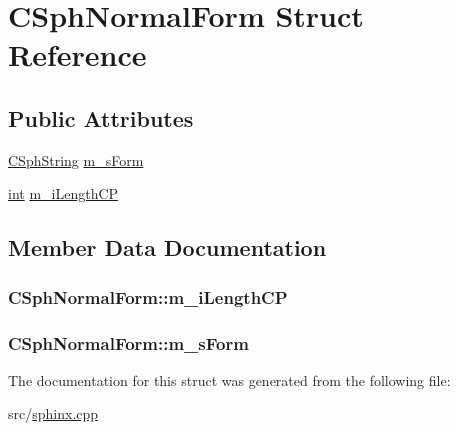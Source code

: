 \hypertarget{structCSphNormalForm}{\section{C\-Sph\-Normal\-Form Struct Reference}
\label{structCSphNormalForm}
}
\subsection*{Public Attributes}
\begin{DoxyCompactItemize}
\item 
\hyperlink{structCSphString}{C\-Sph\-String} \hyperlink{structCSphNormalForm_ab12c90fd6c4bee1e81d4bf50fff2de90}{m\-\_\-s\-Form}
\item 
\hyperlink{sphinxexpr_8cpp_a4a26e8f9cb8b736e0c4cbf4d16de985e}{int} \hyperlink{structCSphNormalForm_a0d9d2a8f0ed99cbb8d8a1b5eb41b5d57}{m\-\_\-i\-Length\-C\-P}
\end{DoxyCompactItemize}


\subsection{Member Data Documentation}
\hypertarget{structCSphNormalForm_a0d9d2a8f0ed99cbb8d8a1b5eb41b5d57}{
\subsubsection[{m\-\_\-i\-Length\-C\-P}]{ C\-Sph\-Normal\-Form\-::m\-\_\-i\-Length\-C\-P}}\label{structCSphNormalForm_a0d9d2a8f0ed99cbb8d8a1b5eb41b5d57}
\hypertarget{structCSphNormalForm_ab12c90fd6c4bee1e81d4bf50fff2de90}{
\subsubsection[{m\-\_\-s\-Form}]{ C\-Sph\-Normal\-Form\-::m\-\_\-s\-Form}}\label{structCSphNormalForm_ab12c90fd6c4bee1e81d4bf50fff2de90}


The documentation for this struct was generated from the following file\-:\begin{DoxyCompactItemize}
\item 
src/\hyperlink{sphinx_8cpp}{sphinx.\-cpp}\end{DoxyCompactItemize}
